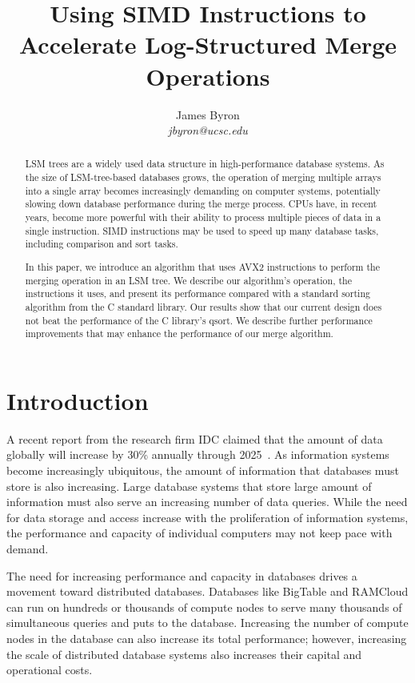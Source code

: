 \documentclass[10pt,twocolumn]{article}
\begin{document}
\title{Using SIMD Instructions to Accelerate Log-Structured Merge Operations}

\author{
{\rm James Byron} \\
\textit{jbyron@ucsc.edu}
}

\maketitle

\begin{abstract}
LSM trees are a widely used data structure in high-performance database systems.  As the size of LSM-tree-based databases grows, the operation of merging multiple arrays into a single array becomes increasingly demanding on computer systems, potentially slowing down database performance during the merge process.  CPUs have, in recent years, become more powerful with their ability to process multiple pieces of data in a single instruction.  SIMD instructions may be used to speed up many database tasks, including comparison and sort tasks.

In this paper, we introduce an algorithm that uses AVX2 instructions to perform the merging operation in an LSM tree.  We describe our algorithm's operation, the instructions it uses, and present its performance compared with a standard sorting algorithm from the C standard library.  Our results show that our current design does not beat the performance of the C library's qsort.  We describe further performance improvements that may enhance the performance of our merge algorithm.
\end{abstract}


\section{Introduction}
A recent report from the research firm IDC claimed that the amount of data globally will increase by 30\% annually through 2025~\cite{p3}.  As information systems become increasingly ubiquitous, the amount of information that databases must store is also increasing.  Large database systems that store large amount of information must also serve an increasing number of data queries.  While the need for data storage and access increase with the proliferation of information systems, the performance and capacity of individual computers may not keep pace with demand.

The need for increasing performance and capacity in databases drives a movement toward distributed databases.  Databases like BigTable and RAMCloud can run on hundreds or thousands of compute nodes to serve many thousands of simultaneous queries and puts to the database.  Increasing the number of compute nodes in the database can also increase its total performance; however, increasing the scale of distributed database systems also increases their capital and operational costs.
\end{document}
